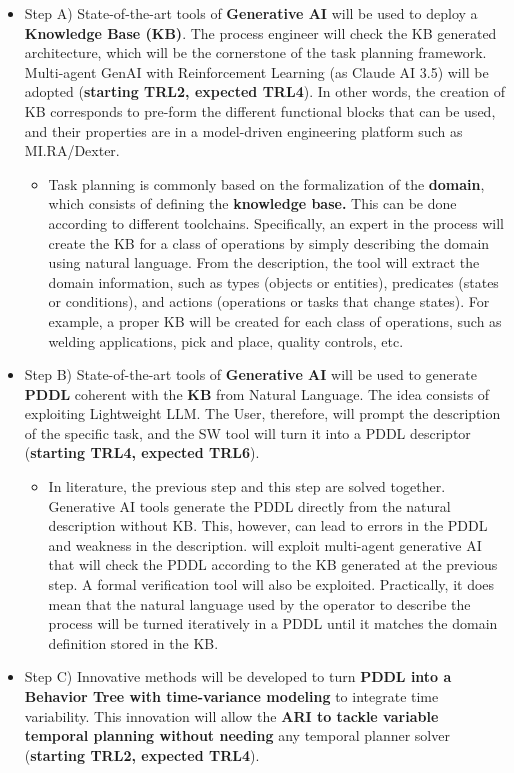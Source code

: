 \begin{itemize}
\item
  Step A) State-of-the-art tools of \textbf{Generative AI} will be used
  to deploy a \textbf{Knowledge Base (KB)}. The process engineer will
  check the KB generated architecture, which will be the cornerstone of
  the task planning framework. Multi-agent GenAI with Reinforcement
  Learning (as Claude AI 3.5) will be adopted (\textbf{starting TRL2,
  expected TRL4}). In other words, the creation of KB corresponds to
  pre-form the different functional blocks that can be used, and their
  properties are in a model-driven engineering platform such as
  MI.RA/Dexter.

  \begin{itemize}
  \item
    Task planning is commonly based on the formalization of the
    \textbf{domain}, which consists of defining the \textbf{knowledge
    base.} This can be done according to different toolchains.
    Specifically, an expert in the process will create the KB for a
    class of operations by simply describing the domain using natural
    language. From the description, the tool will extract the domain
    information, such as types (objects or entities), predicates (states
    or conditions), and actions (operations or tasks that change
    states). For example, a proper KB will be created for each class of
    operations, such as welding applications, pick and place, quality
    controls, etc.
  \end{itemize}
\item
  Step B) State-of-the-art tools of \textbf{Generative AI} will be used
  to generate \textbf{PDDL} coherent with the \textbf{KB} from Natural
  Language. The idea consists of exploiting Lightweight LLM. The User,
  therefore, will prompt the description of the specific task, and the
  SW tool will turn it into a PDDL descriptor (\textbf{starting TRL4,
  expected TRL6}).

  \begin{itemize}
  \item
    In literature, the previous step and this step are solved together.
    Generative AI tools generate the PDDL directly from the natural
    description without KB. This, however, can lead to errors in the
    PDDL and weakness in the description.  will exploit
    multi-agent generative AI that will check the PDDL according to the
    KB generated at the previous step. A formal verification tool will
    also be exploited. Practically, it does mean that the natural
    language used by the operator to describe the process will be turned
    iteratively in a PDDL until it matches the domain definition stored
    in the KB.
  \end{itemize}
\item
  Step C) Innovative methods will be developed to turn \textbf{PDDL into
  a Behavior Tree with time-variance modeling} to integrate time
  variability. This innovation will allow the \textbf{ARI to tackle
  variable temporal planning without needing} any temporal planner
  solver (\textbf{starting TRL2, expected TRL4}).


\end{itemize}
